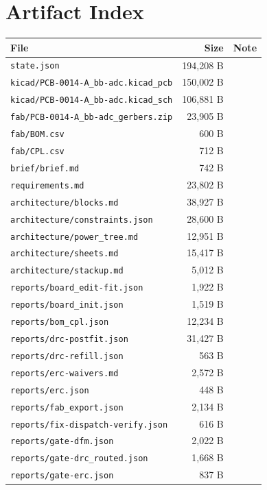 \documentclass[11pt,a4paper]{article}
\begin{document}
\section{Artifact Index}
{\small
\begin{longtable}{p{9cm}rp{4cm}}
\toprule
\textbf{File} & \textbf{Size} & \textbf{Note} \\
\midrule
\endhead
\texttt{state.json} & 194,208 B &  \\
\texttt{kicad/PCB-0014-A\_bb-adc.kicad\_pcb} & 150,002 B &  \\
\texttt{kicad/PCB-0014-A\_bb-adc.kicad\_sch} & 106,881 B &  \\
\texttt{fab/PCB-0014-A\_bb-adc\_gerbers.zip} & 23,905 B &  \\
\texttt{fab/BOM.csv} & 600 B &  \\
\texttt{fab/CPL.csv} & 712 B &  \\
\texttt{brief/brief.md} & 742 B &  \\
\texttt{requirements.md} & 23,802 B &  \\
\texttt{architecture/blocks.md} & 38,927 B &  \\
\texttt{architecture/constraints.json} & 28,600 B &  \\
\texttt{architecture/power\_tree.md} & 12,951 B &  \\
\texttt{architecture/sheets.md} & 15,417 B &  \\
\texttt{architecture/stackup.md} & 5,012 B &  \\
\texttt{reports/board\_edit-fit.json} & 1,922 B &  \\
\texttt{reports/board\_init.json} & 1,519 B &  \\
\texttt{reports/bom\_cpl.json} & 12,234 B &  \\
\texttt{reports/drc-postfit.json} & 31,427 B &  \\
\texttt{reports/drc-refill.json} & 563 B &  \\
\texttt{reports/erc-waivers.md} & 2,572 B &  \\
\texttt{reports/erc.json} & 448 B &  \\
\texttt{reports/fab\_export.json} & 2,134 B &  \\
\texttt{reports/fix-dispatch-verify.json} & 616 B &  \\
\texttt{reports/gate-dfm.json} & 2,022 B &  \\
\texttt{reports/gate-drc\_routed.json} & 1,668 B &  \\
\texttt{reports/gate-erc.json} & 837 B &  \\

\end{longtable}}
\end{document}
